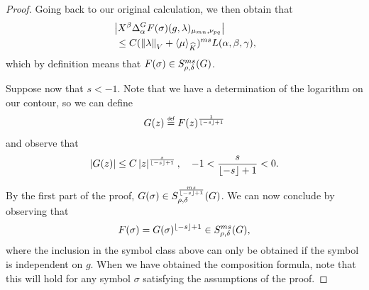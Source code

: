 \begin{proof}
    Going back to our original calculation,
    we then obtain that
    \begin{align*}
        &\abs {%
            \LeftDifferentialOperator \beta \DifferenceOperator \alpha
            F(\sigma)(g, \lambda)_{\mu_{m n}, \nu_{p q}}
        }\\
        &\ \leq C
        (\norm \lambda + \JapaneseBracket \CompactGroup \mu)^{m s}
        L(\alpha, \beta, \gamma),
    \end{align*}
    which by definition means that $F(\sigma) \in S^{m s}_{\rho, \delta}(G)$.

    Suppose now that $s < -1$.
    Note that we have a determination of the logarithm on our contour,
    so we can define
    \begin{align*}
        G(z) \defeq F(z)^{\frac 1 {\Floor{-s} + 1}}
    \end{align*}
    and observe that
    \begin{align*}
        \left|{G(z)}\right| \leq C \left|{z}\right|^{\frac s {\lfloor-s\rfloor + 1}},
        \quad
        -1 < \frac s {\lfloor-s\rfloor + 1} < 0.
    \end{align*}

    By the first part of the proof,
    $G(\sigma) \in S^{\frac {m s} {\lfloor-s\rfloor +1}}_{\rho, \delta}(G)$.
    We can now conclude by observing that
    \begin{align*}
        F(\sigma) = G(\sigma)^{\lfloor-s\rfloor + 1} \in S^{m s}_{\rho, \delta}(G),
    \end{align*}
    where the inclusion in the symbol class above can only be obtained
    if the symbol is independent on $g$.
    When we have obtained the composition formula,
    note that this will hold for any symbol $\sigma$ satisfying the assumptions of the proof.
\end{proof}

